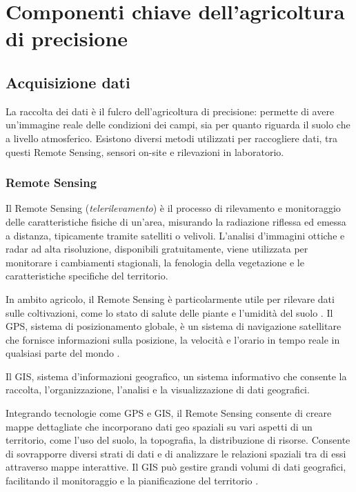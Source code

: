 \documentclass[12pt,a4paper,openright,twoside, openany]{book}
\begin{document}
\section{Componenti chiave dell’agricoltura di precisione}
\label{componenti-chiave}

\subsection{Acquisizione dati}

La raccolta dei dati è il fulcro dell'agricoltura di precisione: permette di avere un'immagine reale delle condizioni dei campi, sia per quanto riguarda il suolo che a livello atmosferico.
Esistono diversi metodi utilizzati per raccogliere dati, tra questi Remote Sensing, sensori on-site e rilevazioni in laboratorio.

\subsubsection{Remote Sensing}

Il Remote Sensing (\textit{telerilevamento}) è il processo di rilevamento e monitoraggio delle caratteristiche fisiche di un'area, misurando la radiazione riflessa ed emessa a distanza, tipicamente tramite satelliti o velivoli\cite{USGS-REMOTE-SENSING}.
L'analisi d'immagini ottiche e radar ad alta risoluzione, disponibili gratuitamente, viene utilizzata per monitorare i cambiamenti stagionali, la fenologia della vegetazione e le caratteristiche specifiche del territorio.

In ambito agricolo, il Remote Sensing è particolarmente utile per rilevare dati sulle coltivazioni, come lo stato di salute delle piante e l'umidità del suolo \cite{FAO-REMOTE-SENSING}.
Il \ac{GPS}, sistema di posizionamento globale, è un sistema di navigazione satellitare che fornisce informazioni sulla posizione, la velocità e l'orario in tempo reale in qualsiasi parte del mondo \cite{GPS-GOV}.

Il \ac{GIS}, sistema d'informazioni geografico, un sistema informativo che consente la raccolta, l'organizzazione, l'analisi e la visualizzazione di dati geografici.

Integrando tecnologie come \ac{GPS} e \ac{GIS}, il Remote Sensing consente di creare mappe dettagliate che incorporano dati geo spaziali su vari aspetti di un territorio, come l'uso del suolo, la topografia, la distribuzione di risorse. Consente di sovrapporre diversi strati di dati e di analizzare le relazioni spaziali tra di essi attraverso mappe interattive. Il GIS può gestire grandi volumi di dati geografici, facilitando il monitoraggio e la pianificazione del territorio \cite{GIS-ESRI}.
\end{document}
